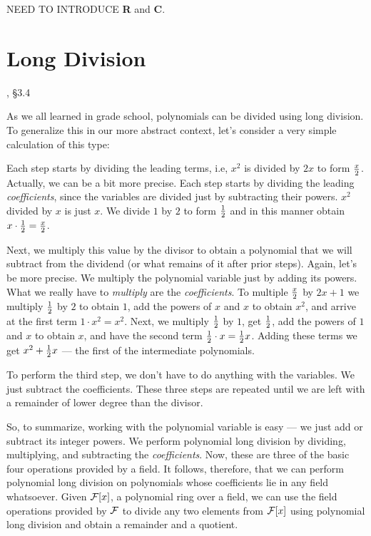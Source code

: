 NEED TO INTRODUCE {\bf R} and {\bf C}.

\section{Long Division}
, \S3.4

As we all learned in grade school, polynomials can be divided
using long division.  To generalize this in our more abstract
context, let's consider a very simple calculation of this type:



Each step starts by dividing the leading terms, i.e, $x^2$ is divided
by $2x$ to form $x\over 2$.  Actually, we can be a bit more precise.
Each step starts by dividing the leading {\it coefficients},
since the variables are divided just by subtracting their
powers. $x^2$ divided by $x$ is just $x$.  We divide $1$ by $2$
to form $1\over2$ and in this manner obtain $x\cdot{1\over2}={x\over2}$.

Next, we multiply this value by the divisor to obtain a polynomial
that we will subtract from the dividend (or what remains of it after
prior steps).  Again, let's be more precise.  We multiply the
polynomial variable just by adding its powers.  What we really have to
{\it multiply} are the {\it coefficients}.  To multiple $x\over2$ by
$2x+1$ we multiply $1\over2$ by $2$ to obtain $1$, add the powers of
$x$ and $x$ to obtain $x^2$, and arrive at the first term $1\cdot
x^2=x^2$.  Next, we multiply $1\over2$ by $1$, get $1\over2$, add the
powers of $1$ and $x$ to obtain $x$, and have the second term
${1\over2}\cdot x={1\over2}x$.  Adding these terms we get
$x^2+{1\over2}x$ --- the first of the intermediate polynomials.

To perform the third step, we don't have to do anything with
the variables.  We just subtract the coefficients.  These
three steps are repeated until we are left with a remainder
of lower degree than the divisor.

So, to summarize, working with the polynomial variable is easy --- we
just add or subtract its integer powers.  We perform polynomial long
division by dividing, multiplying, and subtracting the {\it
coefficients}.  Now, these are three of the basic four operations
provided by a field.  It follows, therefore, that we can perform
polynomial long division on polynomials whose coefficients lie in any
field whatsoever.  Given ${\cal F}[x]$, a polynomial ring over a
field, we can use the field operations provided by ${\cal F}$ to
divide any two elements from ${\cal F}[x]$ using polynomial long
division and obtain a remainder and a quotient.


